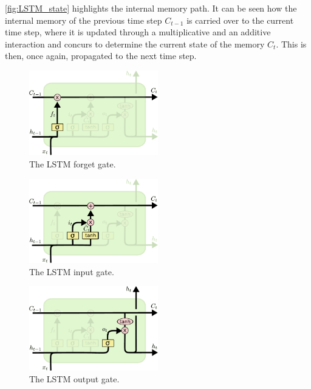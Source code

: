 \autoref{fig:LSTM_state} highlights the internal memory path. It can be seen
how the internal memory of the previous time step $C_{t-1}$ is carried over to
the current time step, where it is updated through a multiplicative and an
additive interaction and concurs to determine the current state of the memory
$C_t$. This is then, once again, propagated to the next time step.

\begin{figure}[p]
    \centering
    \includegraphics[width=0.5\textwidth]{pdf/LSTM_forget_gate.pdf}
    \caption{The LSTM forget gate.\label{fig:LSTM_forget_gate}}
\end{figure}
\begin{figure}[p]
    \centering
    \includegraphics[width=0.5\textwidth]{pdf/LSTM_input_gate.pdf}
    \caption{The LSTM input gate.\label{fig:LSTM_input_gate}}
\end{figure}
\begin{figure}[p]
    \centering
    \includegraphics[width=0.5\textwidth]{pdf/LSTM_output_gate.pdf}
    \caption{The LSTM output gate.\label{fig:LSTM_output_gate}}
\end{figure}

